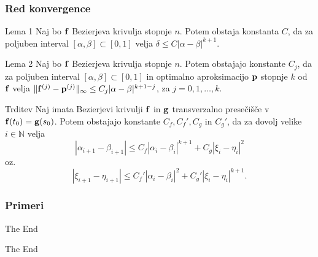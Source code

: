 \documentclass[unknownkeysallowed]{beamer}
\def\N{\mathbb N}
\begin{document}

\begin{frame}
\frametitle{Red konvergence}
\begin{small}
\begin{block}{Lema 1}
Naj bo ${\bf f}$ Bezierjeva krivulja stopnje $n$. Potem obstaja konstanta $C$, da za poljuben interval $[\alpha,\beta]\subset[0,1]$ velja $\delta \leq C |\alpha - \beta|^{k+1}$.
\end{block}

\begin{block}{Lema 2}
Naj bo ${\bf f}$ Bezierjeva krivulja stopnje $n$. Potem obstajajo konstante $C_{j}$, da za poljuben interval $[\alpha,\beta]\subset[0,1]$ in optimalno aproksimacijo ${\bf p}$ stopnje $k$ od ${\bf f}$ velja
$\lVert {\bf f}^{(j)} - {\bf p}^{(j)} \rVert _{\infty} \leq C_{j}|\alpha - \beta|^{k+1-j}$, za $j=0,1,\ldots,k$. 
\end{block}

\begin{block}{Trditev}
Naj imata Bezierjevi krivulji ${\bf f}$ in ${\bf g}$ transverzalno presečišče v ${\bf f}(t_0)={\bf g}(s_0)$. Potem obstajajo konstante $C_f, C_f', C_g$ in $C_g'$, da za dovolj velike $i\in \N$ velja
$$
|\alpha _{i+1} - \beta _{i+1}| \leq C_f |\alpha _{i} - \beta _{i}|^{k+1} + C_g|\xi _{i} - \eta _{i}|^2
$$
oz.
$$
|\xi _{i+1} - \eta _{i+1}| \leq C_f' |\alpha _{i} - \beta _{i}|^{2} + C_g'|\xi _{i} - \eta _{i}|^{k+1}.
$$

\end{block}
\end{small}
\end{frame}

\begin{frame}
\frametitle{Primeri}
\center
\end{frame}


\begin{frame}{The End}
\Huge{\centerline{The End}}
\end{frame}

\end{document}
